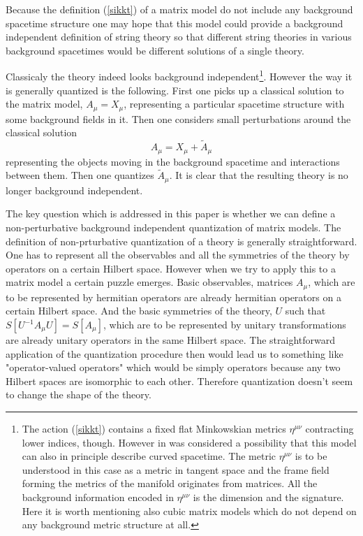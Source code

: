 \documentclass[a4paper,11pt]{article}
\begin{document}
Because the definition (\ref{sikkt}) of a matrix model do not
include any background spacetime structure one may hope that this
model could provide a background independent definition of string
theory so that different string theories in various background
spacetimes would be different solutions of a single theory.

Classicaly the theory indeed looks background
independent\footnote[1]{The action (\ref{sikkt}) contains a fixed
flat Minkowskian metrics $\eta^{\mu \nu}$ contracting lower
indices, though. However in \cite{stiib} was considered a
possibility that this model can also in principle describe curved
spacetime. The metric $\eta^{\mu \nu}$ is to be understood in this
case as a metric in tangent space and the frame field forming the
metrics of the manifold originates from matrices. All the
background information encoded in $\eta^{\mu \nu}$ is the
dimension and the signature. Here it is worth mentioning also
cubic matrix models \cite{cmm} which do not depend on any
background metric structure at all.}. However the way it is
generally quantized is the following. First one picks up a
classical solution to the matrix model, $A_\mu=X_\mu$,
representing a particular spacetime structure with some background
fields in it. Then one considers small perturbations around the
classical solution
\begin{equation}
A_\mu=X_\mu+\tilde A_\mu
\end{equation}
representing the objects moving in the background spacetime and
interactions between them. Then one quantizes $\tilde A_\mu$. It
is clear that the resulting theory is no longer background
independent.

The key question which is addressed in this paper is whether we
can define a non-perturbative background independent quantization
of matrix models. The definition of non-prturbative quantization
of a theory is generally straightforward. One has to represent all
the observables and all the symmetries of the theory by operators
on a certain Hilbert space. However when we try to apply this to a
matrix model a certain puzzle emerges. Basic observables, matrices
$A_\mu$, which are to be represented by hermitian operators are
already hermitian operators on a certain Hilbert space. And the
basic symmetries of the theory, $U$ such that $S[U^{-1}A_\mu
U]=S[A_\mu]$, which are to be represented by unitary
transformations are already unitary operators in the same Hilbert
space. The straightforward application of the quantization
procedure then would lead us to something like "operator-valued
operators" which would be simply operators because any two Hilbert
spaces are isomorphic to each other. Therefore quantization
doesn't seem to change the shape of the theory.
\end{document}
